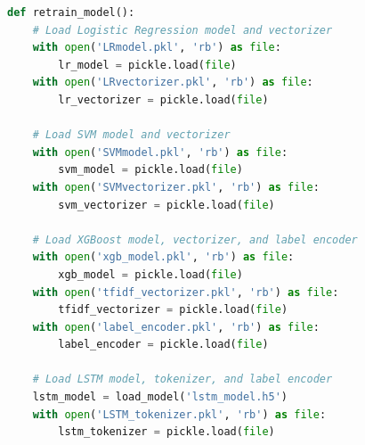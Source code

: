 \begin{tcolorbox}[colback=gray!5!white, colframe=gray!80!black, boxrule=0.5pt, title=Retraining the Ensemble Model]
    \begin{lstlisting}[language=Python]
def retrain_model():
    # Load Logistic Regression model and vectorizer
    with open('LRmodel.pkl', 'rb') as file:
        lr_model = pickle.load(file)
    with open('LRvectorizer.pkl', 'rb') as file:
        lr_vectorizer = pickle.load(file)

    # Load SVM model and vectorizer
    with open('SVMmodel.pkl', 'rb') as file:
        svm_model = pickle.load(file)
    with open('SVMvectorizer.pkl', 'rb') as file:
        svm_vectorizer = pickle.load(file)

    # Load XGBoost model, vectorizer, and label encoder
    with open('xgb_model.pkl', 'rb') as file:
        xgb_model = pickle.load(file)
    with open('tfidf_vectorizer.pkl', 'rb') as file:
        tfidf_vectorizer = pickle.load(file)
    with open('label_encoder.pkl', 'rb') as file:
        label_encoder = pickle.load(file)

    # Load LSTM model, tokenizer, and label encoder
    lstm_model = load_model('lstm_model.h5')
    with open('LSTM_tokenizer.pkl', 'rb') as file:
        lstm_tokenizer = pickle.load(file)
    \end{lstlisting}
\end{tcolorbox}  

